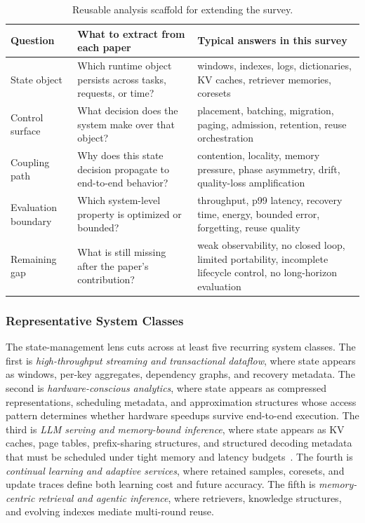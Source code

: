 \documentclass[acmsmall,screen,review]{acmart}
\begin{document}
\begin{table}[t]
\small
\caption{Reusable analysis scaffold for extending the survey.}
\label{tab:scaffold}
\begin{tabularx}{\textwidth}{>{\raggedright\arraybackslash}p{}YY}
\toprule
Question & What to extract from each paper & Typical answers in this survey \\
\midrule
State object & Which runtime object persists across tasks, requests, or time? & windows, indexes, logs, dictionaries, KV caches, retriever memories, coresets \\

Control surface & What decision does the system make over that object? & placement, batching, migration, paging, admission, retention, reuse orchestration \\

Coupling path & Why does this state decision propagate to end-to-end behavior? & contention, locality, memory pressure, phase asymmetry, drift, quality-loss amplification \\

Evaluation boundary & Which system-level property is optimized or bounded? & throughput, p99 latency, recovery time, energy, bounded error, forgetting, reuse quality \\

Remaining gap & What is still missing after the paper's contribution? & weak observability, no closed loop, limited portability, incomplete lifecycle control, no long-horizon evaluation \\
\bottomrule
\end{tabularx}
\end{table}

\subsubsection{Representative System Classes}

The state-management lens cuts across at least five recurring system classes. The first is \emph{high-throughput streaming and transactional dataflow}, where state appears as windows, per-key aggregates, dependency graphs, and recovery metadata. The second is \emph{hardware-conscious analytics}, where state appears as compressed representations, scheduling metadata, and approximation structures whose access pattern determines whether hardware speedups survive end-to-end execution. The third is \emph{LLM serving and memory-bound inference}, where state appears as KV caches, page tables, prefix-sharing structures, and structured decoding metadata that must be scheduled under tight memory and latency budgets~\cite{kwon2023pagedattention,agrawal2024sarathi,zheng2023sglang}. The fourth is \emph{continual learning and adaptive services}, where retained samples, coresets, and update traces define both learning cost and future accuracy. The fifth is \emph{memory-centric retrieval and agentic inference}, where retrievers, knowledge structures, and evolving indexes mediate multi-round reuse.
\end{document}
